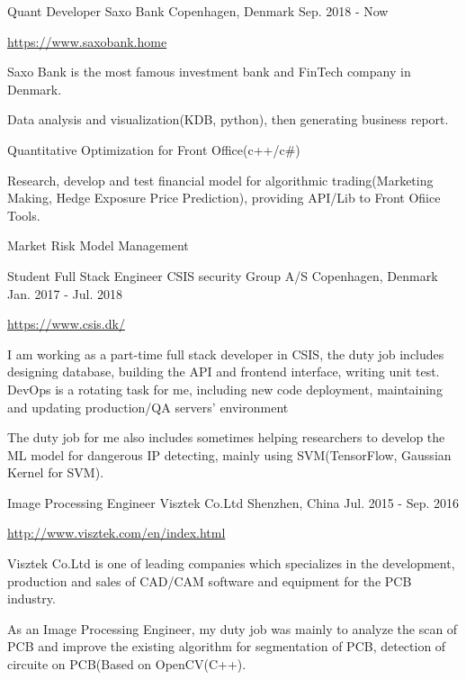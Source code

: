 \begin{cventries}
  \cventry
    {Quant Developer}
    {Saxo Bank}
    {Copenhagen, Denmark}
    {Sep. 2018 - Now}
    {
	    \begin{cvitems}
            \item {\url{https://www.saxobank.home}}
            \item {Saxo Bank is the most famous investment bank and FinTech company in Denmark.}
	          \item {Data analysis and visualization(KDB, python), then generating business report.}
	          \item {Quantitative Optimization for Front Office(c++/c#)}
            \item {Research, develop and test financial model for algorithmic trading(Marketing Making, Hedge Exposure Price Prediction), providing API/Lib to Front Ofiice Tools.}
            \item {Market Risk Model Management}
	    \end{cvitems}
    }
  \cventry
    {Student Full Stack Engineer}
    {CSIS security Group A/S}
    {Copenhagen, Denmark}
    {Jan. 2017 - Jul. 2018}
    {
      \begin{cvitems}
        \item {\url{https://www.csis.dk/}}
        \item {I am working as a part-time full stack developer in CSIS, the duty job includes designing database, building the API and frontend interface, writing unit test. DevOps is a rotating task for me, including new code deployment, maintaining and updating production/QA servers' environment}
	\item {The duty job for me also includes sometimes helping researchers to develop the ML model for dangerous IP detecting, mainly using SVM(TensorFlow, Gaussian Kernel for SVM).}
      \end{cvitems}
    }
  \cventry
    {Image Processing Engineer}
    {Visztek Co.Ltd}
    {Shenzhen, China}
    {Jul. 2015 - Sep. 2016}
    {
      \begin{cvitems}
        \item {\url{http://www.visztek.com/en/index.html}}
        \item {Visztek Co.Ltd is one of leading companies which specializes in the development, production and sales of CAD/CAM software and equipment for the PCB industry.}
	\item {As an Image Processing Engineer, my duty job was mainly to analyze the scan of PCB and improve the existing algorithm for segmentation of PCB, detection of circuite on PCB(Based on OpenCV(C++).}

\end{cvitems}}
\end{cventries}
